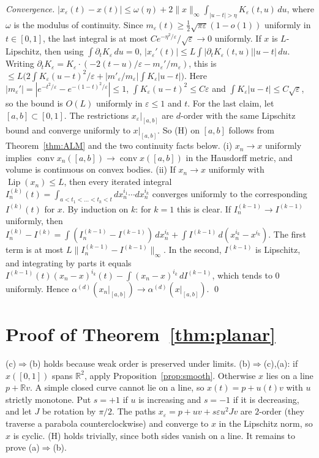 \documentclass[11pt]{amsart}
\theoremstyle{definition}
\newcommand{\R}{\mathbb{R}}
\newcommand{\conv}{\operatorname{conv}}
\begin{document}
\emph{Convergence.} $|x_\varepsilon(t)-x(t)|\le\omega(\eta)+2\|x\|_\infty\int_{|u-t|>\eta}K_\varepsilon(t,u)\,du$, where $\omega$ is the modulus of continuity.
Since $m_\varepsilon(t)\ge\frac12\sqrt{\pi\varepsilon}(1-o(1))$ uniformly in $t\in[0,1]$, the last integral is at most
$Ce^{-\eta^2/\varepsilon}/\sqrt\varepsilon\to0$ uniformly. If $x$ is $L$-Lipschitz, then using $\int\partial_tK_\varepsilon\,du=0$,
$|x_\varepsilon'(t)|\le L\int|\partial_tK_\varepsilon(t,u)||u-t|\,du$. Writing
$\partial_tK_\varepsilon=K_\varepsilon\cdot(-2(t-u)/\varepsilon-m_\varepsilon'/m_\varepsilon)$, this is
$\le L\big(2\int K_\varepsilon(u-t)^2/\varepsilon+|m'_\varepsilon/m_\varepsilon|\int K_\varepsilon|u-t|\big)$. Here $|m_\varepsilon'|=|e^{-t^2/\varepsilon}-e^{-(1-t)^2/\varepsilon}|\le1$,
$\int K_\varepsilon(u-t)^2\le C\varepsilon$ and $\int K_\varepsilon|u-t|\le C\sqrt\varepsilon$, so the bound is $O(L)$ uniformly in $\varepsilon\le1$ and $t$.
For the last claim, let $[a,b]\subset[0,1]$. The restrictions $x_\varepsilon|_{[a,b]}$ are $d$-order with the same Lipschitz bound and converge uniformly to
$x|_{[a,b]}$. So (H) on $[a,b]$ follows from Theorem~\ref{thm:ALM} and the two continuity facts below.
(i) $x_n\to x$ uniformly implies $\conv x_n([a,b])\to\conv x([a,b])$ in the Hausdorff metric, and volume is continuous on convex bodies.
(ii) If $x_n\to x$ uniformly with $\operatorname{Lip}(x_n)\le L$, then every iterated integral
$I^{(k)}_n(t)=\int_{a<t_1<\dots<t_k<t}dx_n^{i_1}\cdots dx_n^{i_k}$ converges uniformly to the corresponding $I^{(k)}(t)$ for $x$.
By induction on $k$: for $k=1$ this is clear. If $I^{(k-1)}_n\to I^{(k-1)}$ uniformly, then
$I_n^{(k)}-I^{(k)}=\int(I^{(k-1)}_n-I^{(k-1)})\,dx_n^{i_k}+\int I^{(k-1)}\,d(x_n^{i_k}-x^{i_k})$.
The first term is at most $L\|I^{(k-1)}_n-I^{(k-1)}\|_\infty$. In the second, $I^{(k-1)}$ is Lipschitz, and integrating by parts it equals
$I^{(k-1)}(t)(x_n-x)^{i_k}(t)-\int(x_n-x)^{i_k}\,dI^{(k-1)}$, which tends to $0$ uniformly. Hence $\alpha^{(d)}(x_n|_{[a,b]})\to\alpha^{(d)}(x|_{[a,b]})$. \qed

\section{Proof of Theorem~\ref{thm:planar}}

(c)$\Rightarrow$(b) holds because weak order is preserved under limits.
(b)$\Rightarrow$(c),(a): if $x([0,1])$ spans $\R^2$, apply Proposition~\ref{prop:smooth}. Otherwise $x$ lies on a line $p+\R v$.
A simple closed curve cannot lie on a line, so $x(t)=p+u(t)v$ with $u$ strictly monotone. Put $s=+1$ if $u$ is increasing and $s=-1$ if it is decreasing, and let $J$ be
rotation by $\pi/2$. The paths $x_\varepsilon=p+uv+s\varepsilon u^2Jv$ are $2$-order (they traverse a parabola counterclockwise) and converge to
$x$ in the Lipschitz norm, so $x$ is cyclic. (H) holds trivially, since both sides vanish on a line.
It remains to prove (a)$\Rightarrow$(b).
\end{document}
